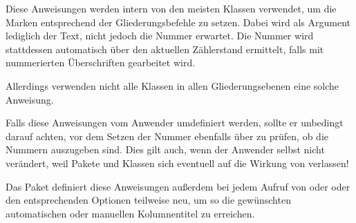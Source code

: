   \begin{Declaration}
  \end{Declaration}
  Diese Anweisungen werden intern von den meisten Klassen verwendet, um die
  Marken entsprechend der Gliederungsbefehle zu setzen. Dabei wird als
  Argument lediglich der Text, nicht jedoch die Nummer erwartet. Die Nummer
  wird stattdessen automatisch über den aktuellen Zählerstand ermittelt, falls
  mit nummerierten Überschriften gearbeitet wird.

  Allerdings verwenden nicht alle Klassen in allen
  Gliederungsebenen eine solche Anweisung. %

  Falls diese Anweisungen vom Anwender umdefiniert werden, sollte
  er unbedingt darauf achten, vor dem Setzen der Nummer
  ebenfalls über  zu prüfen, ob die
  Nummern auszugeben sind. Dies gilt auch, wenn der Anwender
   selbst nicht verändert, weil Pakete
  und Klassen sich eventuell auf die Wirkung von
   verlassen!

  Das Paket  definiert diese Anweisungen außerdem bei jedem Aufruf von
   oder  oder
  den entsprechenden Optionen teilweise neu, um so die gewünschten
  automatischen oder manuellen Kolumnentitel zu erreichen.%
  \EndIndexGroup


